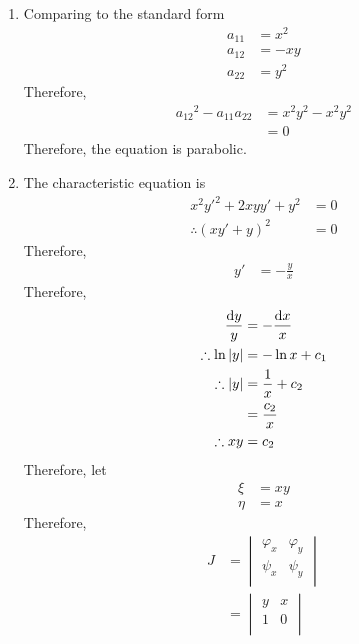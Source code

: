 \documentclass[titlepage, fleqn, a4paper, 12pt, twoside]{article}
\theoremstyle{definition}
\theoremstyle{theorem}
\begin{document}
\begin{solution}
	\begin{enumerate}[leftmargin=*]
		\item
			Comparing to the standard form
			\begin{align*}
				a_{1 1} & = x^2  \\
				a_{1 2} & = -x y \\
				a_{2 2} & = y^2
			\end{align*}
			Therefore,
			\begin{align*}
				{a_{1 2}}^2 - a_{1 1} a_{2 2} & = x^2 y^2 - x^2 y^2 \\
                                                              & = 0
			\end{align*}
			Therefore, the equation is parabolic.
		\item
			The characteristic equation is
			\begin{align*}
				x^2 {y'}^2 + 2 x y y' + y^2          & = 0 \\
				\therefore \left( x y' + y \right)^2 & = 0
			\end{align*}
			Therefore,
			\begin{align*}
				y' & = -\frac{y}{x}
			\end{align*}
			Therefore,
			\begin{align*}
				\frac{\dif y}{y}  & = -\frac{\dif x}{x} \\
				\therefore \ln|y| & = -\ln x + c_1      \\
				\therefore |y|    & = \frac{1}{x} + c_2 \\
                                                  & = \frac{c_2}{x}     \\
				\therefore x y    & = c_2
			\end{align*}
			Therefore, let
			\begin{align*}
				\xi  & = x y \\
				\eta & = x
			\end{align*}
			Therefore,
			\begin{align*}
				J &=
					\begin{vmatrix}
						\varphi_x & \varphi_y \\
						\psi_x    & \psi_y    \\
					\end{vmatrix}\\
				&=
					\begin{vmatrix}
						y & x \\
						1 & 0 \\
					\end{vmatrix}\\

\end{align*}
\end{enumerate}
\end{solution}
\end{document}
